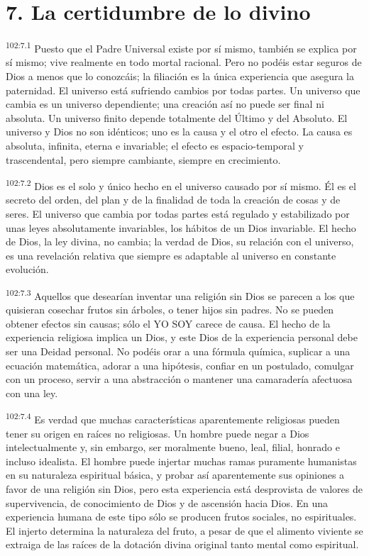 \documentclass[twoside, 11pt]{book}
\begin{document}
\section*{7. La certidumbre de lo divino}
\par
\textsuperscript{102:7.1} Puesto que el Padre Universal existe por sí mismo, también se explica por sí mismo; vive realmente en todo mortal racional. Pero no podéis estar seguros de Dios a menos que lo conozcáis; la filiación es la única experiencia que asegura la paternidad. El universo está sufriendo cambios por todas partes. Un universo que cambia es un universo dependiente; una creación así no puede ser final ni absoluta. Un universo finito depende totalmente del Último y del Absoluto. El universo y Dios no son idénticos; uno es la causa y el otro el efecto. La causa es absoluta, infinita, eterna e invariable; el efecto es espacio-temporal y trascendental, pero siempre cambiante, siempre en crecimiento.

\par
\textsuperscript{102:7.2} Dios es el solo y único hecho en el universo causado por sí mismo. Él es el secreto del orden, del plan y de la finalidad de toda la creación de cosas y de seres. El universo que cambia por todas partes está regulado y estabilizado por unas leyes absolutamente invariables, los hábitos de un Dios invariable. El hecho de Dios, la ley divina, no cambia; la verdad de Dios, su relación con el universo, es una revelación relativa que siempre es adaptable al universo en constante evolución.

\par
\textsuperscript{102:7.3} Aquellos que desearían inventar una religión sin Dios se parecen a los que quisieran cosechar frutos sin árboles, o tener hijos sin padres. No se pueden obtener efectos sin causas; sólo el YO SOY carece de causa. El hecho de la experiencia religiosa implica un Dios, y este Dios de la experiencia personal debe ser una Deidad personal. No podéis orar a una fórmula química, suplicar a una ecuación matemática, adorar a una hipótesis, confiar en un postulado, comulgar con un proceso, servir a una abstracción o mantener una camaradería afectuosa con una ley.

\par
\textsuperscript{102:7.4} Es verdad que muchas características aparentemente religiosas pueden tener su origen en raíces no religiosas. Un hombre puede negar a Dios intelectualmente y, sin embargo, ser moralmente bueno, leal, filial, honrado e incluso idealista. El hombre puede injertar muchas ramas puramente humanistas en su naturaleza espiritual básica, y probar así aparentemente sus opiniones a favor de una religión sin Dios, pero esta experiencia está desprovista de valores de supervivencia, de conocimiento de Dios y de ascensión hacia Dios. En una experiencia humana de este tipo sólo se producen frutos sociales, no espirituales. El injerto determina la naturaleza del fruto, a pesar de que el alimento viviente se extraiga de las raíces de la dotación divina original tanto mental como espiritual.
\end{document}
